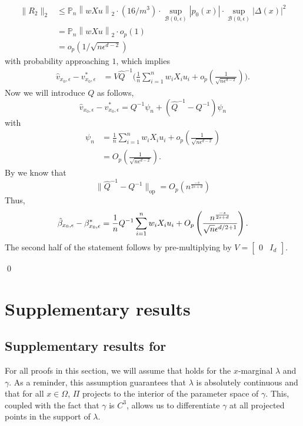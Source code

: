 \documentclass[11pt]{article}
\begin{document}
\begin{align*}
    \|R_2\|_2 &\leq \mathbb{P}_n\left\|wXu\right\|_2\cdot (16/m^3)\cdot \sup_{\mathcal{B}(0, \epsilon)}|p_0(x)|\cdot \sup_{\mathcal{B}(0, \epsilon)}|\Delta(x)|^2 \\
    &= \mathbb{P}_n\left\|wXu\right\|_2 \cdot o_p(1) \\
    &= o_p(1/\sqrt{n\epsilon^{d-2}})
\end{align*}
with probability approaching $1$, which implies
\begin{align*}
    \hat{v}_{x_0, \epsilon} - v^*_{x_0, \epsilon} &= V\hat{Q}^{-1}\bigg(\frac{1}{n}\sum_{i = 1}^nw_iX_iu_i + o_p\left(\frac{1}{\sqrt{n\epsilon^{d-2}}}\right)\bigg).
\end{align*}
Now we will introduce $Q$ as follows,
\begin{equation*}
    \hat{v}_{x_0, \epsilon} - v^*_{x_0, \epsilon} = Q^{-1}\psi_n + (\hat{Q}^{-1} - Q^{-1})\psi_n
\end{equation*}
with
\begin{align*}
    \psi_n &= \frac{1}{n}\sum_{i = 1}^nw_iX_iu_i + o_p\left(\frac{1}{\sqrt{n\epsilon^{d-2}}}\right) \\
    &= O_p\left(\frac{1}{\sqrt{n\epsilon^{d-2}}}\right).
\end{align*}
By  we know that 
\[\|\hat{Q}^{-1} - Q^{-1}\|_{\text{op}} = O_p\left(n^{\frac{-s}{2s+d}}\right)\]
Thus,
\begin{equation}
    \hat{\beta}_{x_0, \epsilon} - \beta^*_{x_0, \epsilon} = \frac{1}{n}Q^{-1}\sum_{i = 1}^nw_iX_iu_i \\
    + O_p\left(\frac{n^{\frac{-s}{2s+d}}}{\sqrt{n}\epsilon^{d/2+1}}\right).
\end{equation}
The second half of the statement follows by pre-multiplying by $V = \begin{bmatrix}
    0 & I_d
\end{bmatrix}.$

\qed{}


\section{Supplementary results}


\subsection{Supplementary results for }

For all proofs in this section, we will assume that  holds for the $x$-marginal $\lambda$ and $\gamma$. As a reminder, this assumption guarantees that $\lambda$ is absolutely continuous and that for all $x \in \Omega$,  $\Pi$ projects to the interior of the parameter space of $\gamma$. This, coupled with the fact that $\gamma$ is $C^3$, allows us to differentiate $\gamma$ at all projected points in the support of $\lambda$.  
\end{document}
